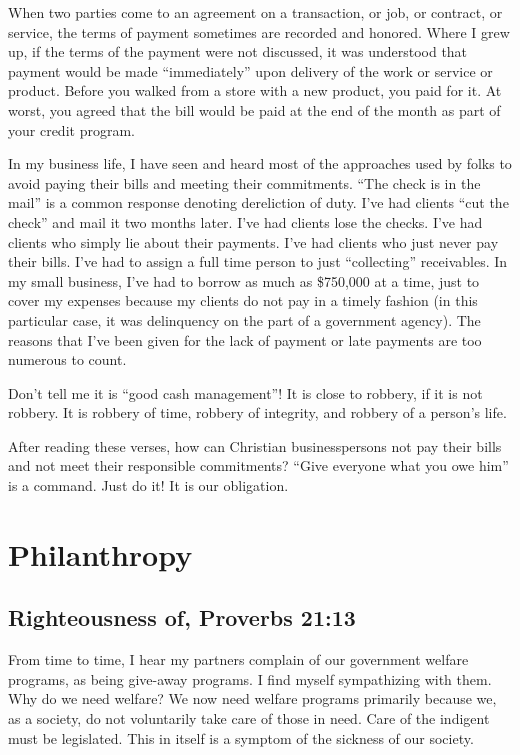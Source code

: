 \documentclass[12pt]{memoir}
\begin{document}
When two parties come to an agreement on a transaction, or job, or
contract, or service, the terms of payment sometimes are recorded
and honored. Where I grew up, if the terms of the payment were not
discussed, it was understood that payment would be made ``immediately''
upon delivery of the work or service or product. Before you walked
from a store with a new product, you paid for it. At worst, you agreed
that the bill would be paid at the end of the month as part of your
credit program. 

In my business life, I have seen and heard most of the approaches
used by folks to avoid paying their bills and meeting their commitments.
``The check is in the mail'' is a common response denoting dereliction
of duty. I've had clients ``cut the check'' and mail it two months
later. I've had clients lose the checks. I've had clients who simply
lie about their payments. I've had clients who just never pay their
bills. I've had to assign a full time person to just ``collecting''
receivables. In my small business, I've had to borrow as much as \$750,000
at a time, just to cover my expenses because my clients do not pay
in a timely fashion (in this particular case, it was delinquency on
the part of a government agency). The reasons that I've been given
for the lack of payment or late payments are too numerous to count.

Don't tell me it is ``good cash management''! It is close to robbery,
if it is not robbery. It is robbery of time, robbery of integrity,
and robbery of a person's life.

After reading these verses, how can Christian businesspersons not
pay their bills and not meet their responsible commitments? ``Give
everyone what you owe him'' is a command. Just do it! It is our obligation.

\section{Philanthropy}

\subsection{Righteousness of, Proverbs 21:13}

From time to time, I hear my partners complain of our government
welfare programs, as being give-away programs. I find myself sympathizing
with them. Why do we need welfare? We now need welfare programs primarily
because we, as a society, do not voluntarily take care of those in
need. Care of the indigent must be legislated. This in itself is a
symptom of the sickness of our society.
\end{document}
